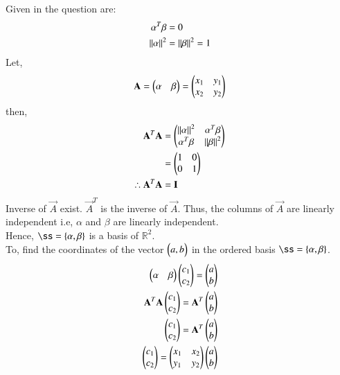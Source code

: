 \documentclass[journal,12pt,twocolumn]{IEEEtran}
\begin{document}
Given in the question are:
\begin{align}
\alpha^T\beta&=0\label{eq0}\\
\left\lVert\alpha\right\rVert^2 &=\left\lVert\beta\right\rVert^2=1 \label{eq1}
\end{align}
Let,
\begin{align}
 \mathbf{A}=\begin{pmatrix}\alpha & \beta\end{pmatrix}=\begin{pmatrix}x_1&y_1\\x_2&y_2\end{pmatrix}
\end{align}
then,
\begin{align}
 \mathbf{A}^T\mathbf{A}&=\begin{pmatrix}\left\lVert\alpha\right\rVert^2 &\alpha^T\beta\\\alpha^T\beta&\left\lVert\beta\right\rVert^2\end{pmatrix}\\ &=\begin{pmatrix}1&0\\0&1\end{pmatrix}\\
 \therefore \mathbf{A}^T\mathbf{A}&=\mathbf{I}
\end{align}
Inverse of $\vec{A}$ exist. $\vec{A}^T$ is the inverse of $\vec{A}$. 
Thus, the columns of $\vec{A}$ are linearly independent i.e, $\alpha$ and $\beta$ are linearly independent. \\
Hence, $\ss=\{\vec{\alpha},\vec{\beta}\}$ is a basis of $\mathbb{R}^2$.\\



To, find the coordinates of the vector $\begin{pmatrix}a,b\end{pmatrix}$ in the ordered basis $\ss=\{\vec{\alpha},\vec{\beta}\}$. 
   \begin{align}
   \begin{pmatrix}\alpha&\beta\end{pmatrix}\begin{pmatrix}c_1\\c_2\end{pmatrix}=\begin{pmatrix}a\\b\end{pmatrix}\\
\mathbf{A}^T\mathbf{A}\begin{pmatrix}c_1\\c_2\end{pmatrix}=\mathbf{A}^T\begin{pmatrix}a\\b\end{pmatrix}\\
\begin{pmatrix}c_1\\c_2\end{pmatrix}=\mathbf{A}^T\begin{pmatrix}a\\b\end{pmatrix}\\
\begin{pmatrix}c_1\\c_2\end{pmatrix}=\begin{pmatrix}x_1&x_2\\y_1&y_2\end{pmatrix}\begin{pmatrix}a\\b\end{pmatrix}
\end{align}
 
\end{document}
